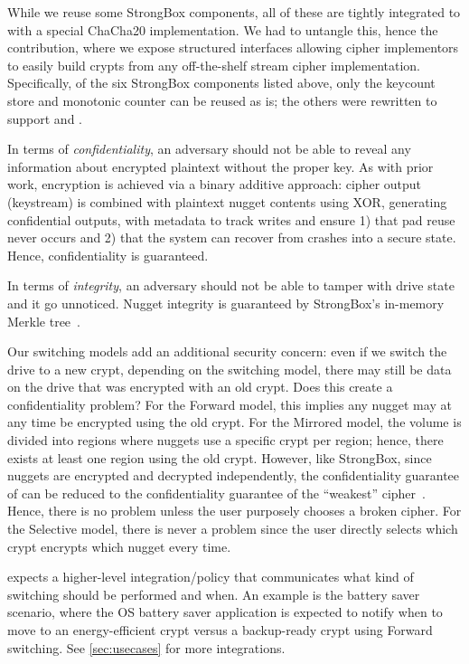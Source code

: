 While we reuse some StrongBox components, all of these are tightly integrated to
with a special ChaCha20 implementation. We had to untangle this, hence the \sysB
contribution, where we expose structured interfaces allowing cipher implementors
to easily build crypts from any off-the-shelf stream cipher implementation.
Specifically, of the six StrongBox components listed above, only the keycount
store and monotonic counter can be reused as is; the others were rewritten to
support \sysA and \sysB.


 In terms of {\em confidentiality}, an
adversary should not be able to reveal any information about encrypted plaintext
without the proper key. As with prior work, encryption is achieved via a binary
additive approach: cipher output (keystream) is combined with plaintext nugget
contents using XOR, generating confidential outputs, with metadata to track
writes and ensure 1) that pad reuse never occurs and 2) that the system can
recover from crashes into a secure state. Hence, confidentiality is guaranteed.

In terms of {\em integrity}, an adversary should not be able to tamper with
drive state and it go unnoticed. Nugget integrity is guaranteed by StrongBox's
in-memory Merkle tree~\cite{StrongBox}.

Our switching models add an additional security concern: even if we switch the
drive to a new crypt, depending on the switching model, there may still be data
on the drive that was encrypted with an old crypt. Does this create a
confidentiality problem? For the Forward model, this implies any nugget may at
any time be encrypted using the old crypt. For the Mirrored model, the volume is
divided into regions where nuggets use a specific crypt per region; hence, there
exists at least one region using the old crypt. However, like StrongBox, since
nuggets are encrypted and decrypted independently, the confidentiality guarantee
of \sys can be reduced to the confidentiality guarantee of the ``weakest''
cipher~\cite{StrongBox}. Hence, there is no problem unless the user purposely
chooses a broken cipher. For the Selective model, there is never a problem since
the user directly selects which crypt encrypts which nugget every time.

 \sys expects a higher-level integration/policy
that communicates what kind of switching should be performed and when. An
example is the battery saver scenario, where the OS battery saver application is
expected to notify \sys when to move to an energy-efficient crypt versus a
backup-ready crypt using Forward switching. See \cref*{sec:usecases} for more
integrations.

